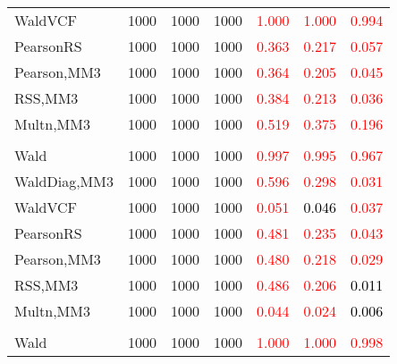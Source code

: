 \documentclass[
]{article}
\begin{document}
\begin{table}[H]
{\begin{tabular}[t]{lrrrrrr}
\hspace{1em}WaldVCF & 1000 & 1000 & 1000 & \textcolor{red}{1.000} & \textcolor{red}{1.000} & \textcolor{red}{0.994}\\
\hspace{1em}PearsonRS & 1000 & 1000 & 1000 & \textcolor{red}{0.363} & \textcolor{red}{0.217} & \textcolor{red}{0.057}\\
\hspace{1em}Pearson,MM3 & 1000 & 1000 & 1000 & \textcolor{red}{0.364} & \textcolor{red}{0.205} & \textcolor{red}{0.045}\\
\hspace{1em}RSS,MM3 & 1000 & 1000 & 1000 & \textcolor{red}{0.384} & \textcolor{red}{0.213} & \textcolor{red}{0.036}\\
\hspace{1em}Multn,MM3 & 1000 & 1000 & 1000 & \textcolor{red}{0.519} & \textcolor{red}{0.375} & \textcolor{red}{0.196}\\
\addlinespace[0.3em]
\multicolumn{7}{l}{\textbf{1F 15V}}\\
\hspace{1em}Wald & 1000 & 1000 & 1000 & \textcolor{red}{0.997} & \textcolor{red}{0.995} & \textcolor{red}{0.967}\\
\hspace{1em}WaldDiag,MM3 & 1000 & 1000 & 1000 & \textcolor{red}{0.596} & \textcolor{red}{0.298} & \textcolor{red}{0.031}\\
\hspace{1em}WaldVCF & 1000 & 1000 & 1000 & \textcolor{red}{0.051} & \textcolor{black}{0.046} & \textcolor{red}{0.037}\\
\hspace{1em}PearsonRS & 1000 & 1000 & 1000 & \textcolor{red}{0.481} & \textcolor{red}{0.235} & \textcolor{red}{0.043}\\
\hspace{1em}Pearson,MM3 & 1000 & 1000 & 1000 & \textcolor{red}{0.480} & \textcolor{red}{0.218} & \textcolor{red}{0.029}\\
\hspace{1em}RSS,MM3 & 1000 & 1000 & 1000 & \textcolor{red}{0.486} & \textcolor{red}{0.206} & \textcolor{black}{0.011}\\
\hspace{1em}Multn,MM3 & 1000 & 1000 & 1000 & \textcolor{red}{0.044} & \textcolor{red}{0.024} & \textcolor{black}{0.006}\\
\addlinespace[0.3em]
\multicolumn{7}{l}{\textbf{2F 10V}}\\
\hspace{1em}Wald & 1000 & 1000 & 1000 & \textcolor{red}{1.000} & \textcolor{red}{1.000} & \textcolor{red}{0.998}\\

\end{tabular}}
\end{table}
\end{document}
